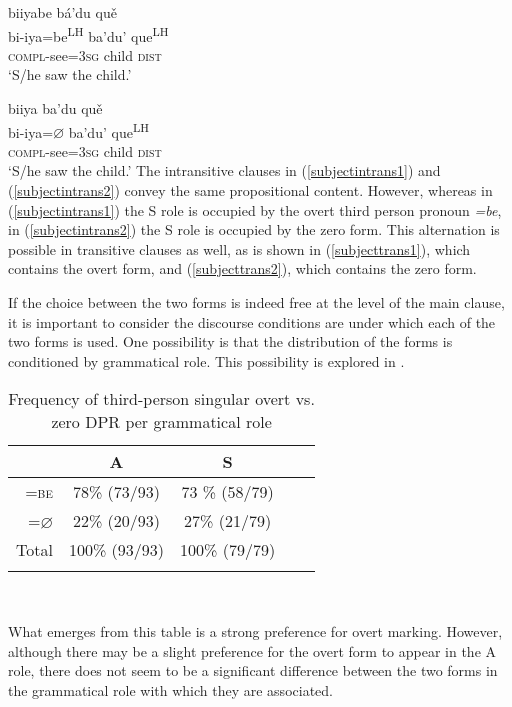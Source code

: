 \ea \label{subjecttrans1} 
\glll biiyabe b\'{a}'du qu\v{e}  \\
bi-iya=be\textsuperscript{LH} ba'du' que\textsuperscript{LH}  \\
\textsc{compl}-see=3\textsc{sg} child \textsc{dist}  \\
\glt `S/he saw the child.' 
\z

\ea \label{subjecttrans2} 
\glll biiya ba'du qu\v{e} \\
bi-iya=$\varnothing$ ba'du' que\textsuperscript{LH} \\
\textsc{compl}-see=3\textsc{sg} child \textsc{dist} \\
\glt `S/he saw the child.' 
\z
The intransitive clauses in (\ref{subjectintrans1}) and (\ref{subjectintrans2}) convey the same propositional content. However, whereas in (\ref{subjectintrans1}) the S role is occupied by the overt third person pronoun \textit{=be}, in (\ref{subjectintrans2}) the S role is occupied by the zero form. This alternation is possible in transitive clauses as well, as is shown in (\ref{subjecttrans1}), which contains the overt form, and (\ref{subjecttrans2}), which contains the zero form. 

If the choice between the two forms is indeed free at the level of the main clause, it is important to consider the discourse conditions are under which each of the two forms is used. One possibility is that the distribution of the forms is conditioned by grammatical role. This possibility is explored in .
\begin{table}

\caption{{Frequency of third-person singular overt vs. zero DPR per grammatical role}}
\begin{tabular}{ r  c  c  c  c }
\lsptoprule
 & A & S \\

\midrule
\textsc{=be} &  78{\%} (73/93) & 73 {\%} (58/79) \\

\textsc{=$\varnothing$} &  22{\%} (20/93)  &  27{\%} (21/79) \\

\midrule
Total&  100{\%} (93/93) &  100{\%} (79/79)  \\

\lspbottomrule
\end{tabular}\\
\label{overtvszero}

\end{table}
What emerges from this table is a strong preference for overt marking. However, although there may be a slight preference for the overt form to appear in the A role, there does not seem to be a significant difference between the two forms in the grammatical role with which they are associated.

